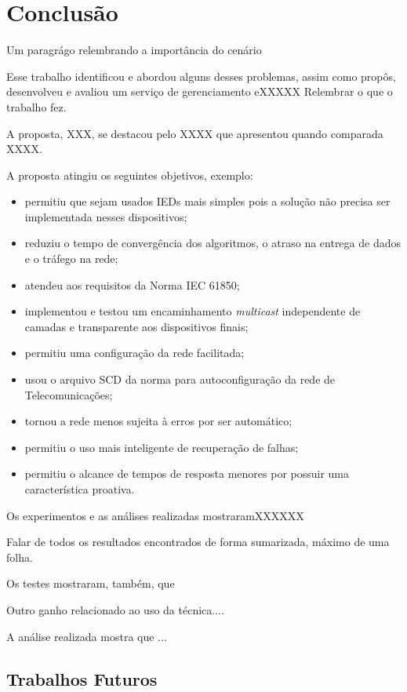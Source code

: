 \chapter{Conclusão} \label{cap:conclusao}

Um paragrágo relembrando a importância do cenário

Esse trabalho identificou e abordou alguns desses problemas, assim como propôs, desenvolveu e avaliou um serviço de gerenciamento eXXXXX
Relembrar o que o trabalho fez.


A proposta, XXX,  se destacou pelo XXXX que apresentou quando comparada XXXX. 

A proposta atingiu os seguintes objetivos, exemplo:
\begin{itemize}
\item permitiu que sejam usados IEDs mais simples pois a solução não precisa ser implementada nesses dispositivos;
\item reduziu o tempo de convergência dos algoritmos, o atraso na entrega de dados e o tráfego na rede;
\item atendeu aos requisitos da Norma IEC 61850;
\item implementou e testou um encaminhamento \textit{multicast} independente de camadas e transparente aos dispositivos finais;
\item permitiu uma configuração da rede facilitada;
\item usou o arquivo SCD da norma para autoconfiguração da rede de Telecomunicações;
\item tornou a rede menos sujeita à erros por ser automático;
\item permitiu o uso mais inteligente de recuperação de falhas;
\item permitiu o alcance de tempos de resposta menores por possuir uma característica proativa.
\end{itemize}

Os experimentos e as análises realizadas mostraramXXXXXX

Falar de todos os resultados encontrados de forma sumarizada, máximo de uma folha.

Os testes mostraram, também, que 


Outro ganho relacionado ao uso da técnica....

A análise realizada mostra que ...

\section{Trabalhos Futuros}\label{sec:8_trabfut}


